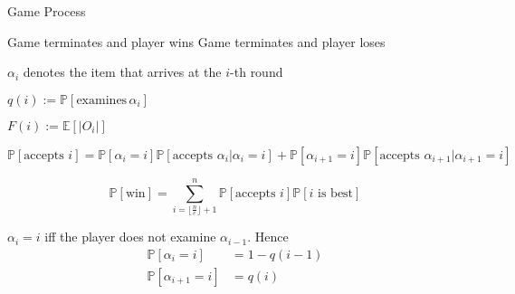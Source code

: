 \documentclass{article}
\newcommand{\prob}{\mathbb{P}}
\newcommand{\expec}{\mathbb{E}}
\begin{document}
\begin{algorithm}
\caption{Game Process}
\label{algo1} 
\begin{algorithmic}[1]







			\State Game terminates and player wins
		\Else
			\State Game terminates and player loses
			\EndIf
			
		
	\EndIf
	
	
\EndFor

\end{algorithmic}
\end{algorithm}

\pagebreak

$\alpha_i$ denotes the item that arrives at the $i$-th round

$q(i) := \prob[\mathrm{examines}\, \alpha_i]$

$F(i) := \expec[|O_i|]$

\begin{equation*}
	\prob[\text{accepts } i] = 
	\prob[\alpha_i = i] 
	\prob[\text{accepts }\alpha_i | \alpha_i = i]
	+ 
	\prob[\alpha_{i+1} = i]
	\prob[\text{accepts }\alpha_{i+1} | \alpha_{i+1} = i]
\end{equation*}

\begin{equation*}
	\prob[\text{win}] = \sum_{i=\lfloor\frac{n}{e}\rfloor+1}^n
	\prob[\text{accepts } i]\prob[i\text{ is best}]
\end{equation*}


$\alpha_i = i$ iff the player does not examine $\alpha_{i-1}$. Hence
\begin{align*}
\prob[\alpha_i = i] &= 1-q(i-1) \\
\prob[\alpha_{i+1} = i] &= q(i) 
\end{align*}
\end{document}
